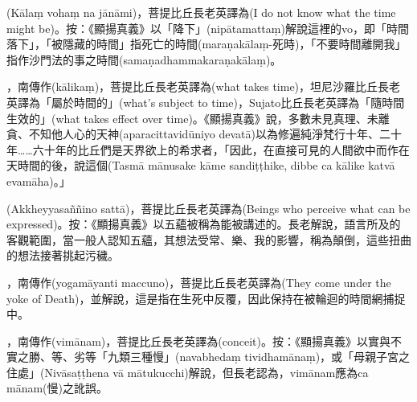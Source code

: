 \startitemgroup[noteitems]
\item{}(Kālaṃ vohaṃ na jānāmi)，菩提比丘長老英譯為(I do not know what the time might be)。按：《顯揚真義》以「降下」(nipātamattaṃ)解說這裡的vo，即「時間落下」，「被隱藏的時間」指死亡的時間(maraṇakālaṃ-死時)，「不要時間離開我」指作沙門法的事之時間(samaṇadhammakaraṇakālaṃ)。
\stopitemgroup

\startitemgroup[noteitems]
\item{}，南傳作(kālikaṃ)，菩提比丘長老英譯為(what takes time)，坦尼沙羅比丘長老英譯為「屬於時間的」(what's subject to time)，Sujato比丘長老英譯為「隨時間生效的」(what takes effect over time)。《顯揚真義》說，多數未見真理、未離貪、不知他人心的天神(aparacittavidūniyo devatā)以為修遍純淨梵行十年、二十年……六十年的比丘們是天界欲上的希求者，「因此，在直接可見的人間欲中而作在天時間的後，說這個(Tasmā mānusake kāme sandiṭṭhike, dibbe ca kālike katvā evamāha)。」
\stopitemgroup

\startitemgroup[noteitems]
\item{}(Akkheyyasaññino sattā)，菩提比丘長老英譯為(Beings who perceive what can be expressed)。按：《顯揚真義》以五蘊被稱為能被講述的。長老解說，語言所及的客觀範圍，當一般人認知五蘊，其想法受常、樂、我的影響，稱為顛倒，這些扭曲的想法接著挑起污穢。
\stopitemgroup

\startitemgroup[noteitems]
\item{}，南傳作(yogamāyanti maccuno)，菩提比丘長老英譯為(They come under the yoke of Death)，並解說，這是指在生死中反覆，因此保持在被輪迴的時間網捕捉中。
\stopitemgroup

\startitemgroup[noteitems]
\item{}，南傳作(vimānam)，菩提比丘長老英譯為(conceit)。按：《顯揚真義》以實與不實之勝、等、劣等「九類三種慢」(navabhedaṃ tividhamānaṃ)，或「母親子宮之住處」(Nivāsaṭṭhena vā mātukucchi)解說，但長老認為，vimānam應為ca mānam(慢)之訛誤。
\stopitemgroup

